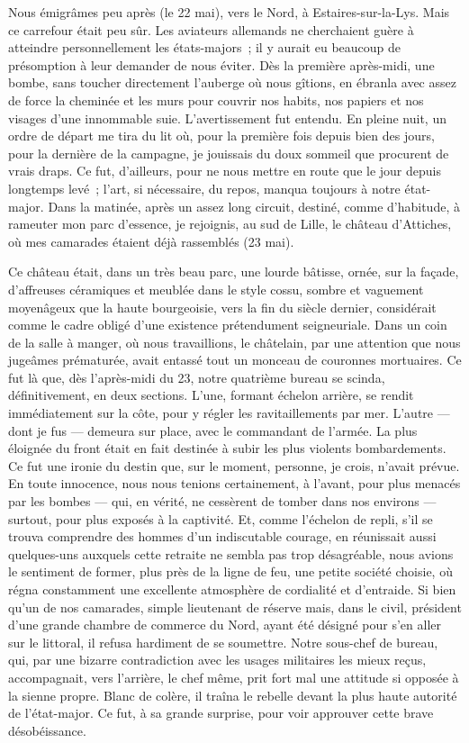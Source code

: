 \documentclass[french,twoside]{book} %
\begin{document}
Nous émigrâmes peu après (le 22 mai), vers le Nord, à Estaires-sur-la-Lys. Mais ce carrefour était peu sûr. Les aviateurs allemands ne cherchaient guère à atteindre personnellement les états-majors ; il y aurait eu beaucoup de présomption à leur demander de nous éviter. Dès la première après-midi, une bombe, sans toucher directement l’auberge où nous gîtions, en ébranla avec assez de force la cheminée et les murs pour couvrir nos habits, nos papiers et nos visages d’une innommable suie. L’avertissement fut entendu. En pleine nuit, un ordre de départ me tira du lit où, pour la première fois depuis bien des jours, pour la dernière de la campagne, je jouissais du doux sommeil que procurent de vrais draps. Ce fut, d’ailleurs, pour ne nous mettre en route que le jour depuis longtemps levé ; l’art, si nécessaire, du repos, manqua toujours à notre état-major. Dans la matinée, après un assez long circuit, destiné, comme d’habitude, à rameuter mon parc d’essence, je rejoignis, au sud de Lille, le château d’Attiches, où mes camarades étaient déjà rassemblés (23 mai).\par
Ce château était, dans un très beau parc, une lourde bâtisse, ornée, sur la façade, d’affreuses céramiques et meublée dans le style cossu, sombre et vaguement moyenâgeux que la haute bourgeoisie, vers la fin du siècle dernier, considérait comme le cadre obligé d’une existence prétendument seigneuriale. Dans un coin de la salle à manger, où nous travaillions, le châtelain, par une attention que nous jugeâmes prématurée, avait entassé tout un monceau de couronnes mortuaires. Ce fut là que, dès l’après-midi du 23, notre quatrième bureau se scinda, définitivement, en deux sections. L’une, formant   échelon arrière, se rendit immédiatement sur la côte, pour y régler les ravitaillements par mer. L’autre — dont je fus — demeura sur place, avec le commandant de l’armée. La plus éloignée du front était en fait destinée à subir les plus violents bombardements. Ce fut une ironie du destin que, sur le moment, personne, je crois, n’avait prévue. En toute innocence, nous nous tenions certainement, à l’avant, pour plus menacés par les bombes — qui, en vérité, ne cessèrent de tomber dans nos environs — surtout, pour plus exposés à la captivité. Et, comme l’échelon de repli, s’il se trouva comprendre des hommes d’un indiscutable courage, en réunissait aussi quelques-uns auxquels cette retraite ne sembla pas trop désagréable, nous avions le sentiment de former, plus près de la ligne de feu, une petite société choisie, où régna constamment une excellente atmosphère de cordialité et d’entraide. Si bien qu’un de nos camarades, simple lieutenant de réserve mais, dans le civil, président d’une grande chambre de commerce du Nord, ayant été désigné pour s’en aller sur le littoral, il refusa hardiment de se soumettre. Notre sous-chef de bureau, qui, par une bizarre contradiction avec les usages militaires les mieux reçus, accompagnait, vers l’arrière, le chef même, prit fort mal une attitude si opposée à la sienne propre. Blanc de colère, il traîna le rebelle devant la plus haute autorité de l’état-major. Ce fut, à sa grande surprise, pour voir approuver cette brave désobéissance.\par
\end{document}
